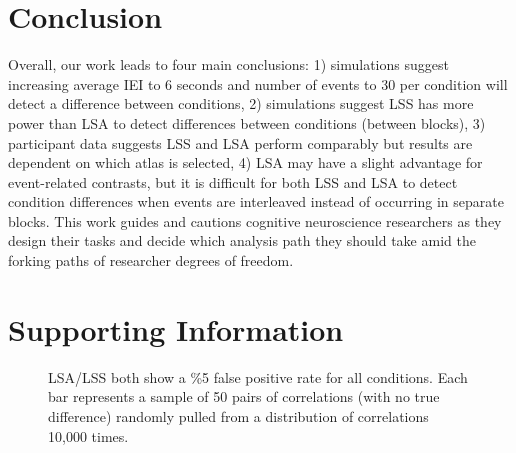 \documentclass[phd,figures,tables,ackpage,abstractpage,publicabstractpage]{uithesis}
\begin{document}
\section{Conclusion}

Overall, our work leads to four main conclusions:
1) simulations suggest increasing average IEI to 6 seconds and number of events to 30 per condition will detect a difference between conditions, 
2) simulations suggest LSS has more power than LSA to detect differences between conditions (between blocks),
3) participant data suggests LSS and LSA perform comparably but results are dependent on which atlas is selected,
4) LSA may have a slight advantage for event-related contrasts,
but it is difficult for both LSS and LSA to detect condition differences when events are interleaved instead of occurring in separate blocks.
This work guides and cautions cognitive neuroscience researchers as they design their tasks and decide
which analysis path they should take amid the forking paths of researcher degrees of freedom.

\section{Supporting Information}

\begin{figure}[H]
  \centering


  \caption[Simulations of false positive rate for LSS/LSA]{
    LSA/LSS both show a \%5 false positive rate for all conditions.
    Each bar represents a sample of 50 pairs of correlations (with no true difference)
    randomly pulled from a distribution of correlations 10,000 times.
  }
  \label{fig:res_sim_fpr}
\end{figure}
\end{document}

